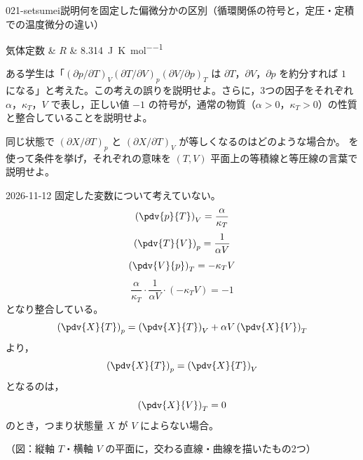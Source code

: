 \documentclass[uplatex,dvipdfmx,a4paper,11pt]{jsarticle}
\begin{document}
\begin{mondai}{021-setsumei}{説明}{何を固定した偏微分かの区別（循環関係の符号と，定圧・定積での温度微分の違い）}
\begin{teisuu}
  気体定数 & $R$ & \qty{8.314}{\joule\per\kelvin\per\mole}\\
\end{teisuu}
\begin{shoumon}
    \item ある学生は「$(\partial p/\partial T)_{V}(\partial T/\partial V)_{p}(\partial V/\partial p)_{T}$ は $\partial T$，$\partial V$，$\partial p$ を約分すれば $1$ になる」と考えた。この考えの誤りを説明せよ。さらに，3つの因子をそれぞれ $\alpha$，$\kappa_{T}$，$V$ で表し，正しい値 $-1$ の符号が，通常の物質（$\alpha > 0$，$\kappa_{T} > 0$）の性質と整合していることを説明せよ。
    \item 同じ状態で $(\partial X/\partial T)_{p}$ と $(\partial X/\partial T)_{V}$ が等しくなるのはどのような場合か。 を使って条件を挙げ，それぞれの意味を $(T,V)$ 平面上の等積線と等圧線の言葉で説明せよ。
  \end{shoumon}
\begin{kotaeutsushi}{2026-11-12}
固定した変数について考えていない。
\[ \left(\pdv{p}{T}\right)_{V}=\frac{\alpha}{\kappa_{T}} \]
\[ \left(\pdv{T}{V}\right)_{p}=\frac{1}{\alpha V} \]
\[ \left(\pdv{V}{p}\right)_{T}=-\kappa_{T}V \]
\[ \frac{\alpha}{\kappa_{T}}\cdot\frac{1}{\alpha V}\cdot(-\kappa_{T}V)=-1 \]
となり整合している。
\[ \left(\pdv{X}{T}\right)_{p}=\left(\pdv{X}{T}\right)_{V}+\alpha V\left(\pdv{X}{V}\right)_{T} \]
より，
\[ \left(\pdv{X}{T}\right)_{p}=\left(\pdv{X}{T}\right)_{V} \]
となるのは，
\[ \left(\pdv{X}{V}\right)_{T}=0 \]
のとき，つまり状態量 $X$ が $V$ によらない場合。

（図：縦軸 $T$・横軸 $V$ の平面に，交わる直線・曲線を描いたもの2つ）


\end{kotaeutsushi}
\end{mondai}
\end{document}
